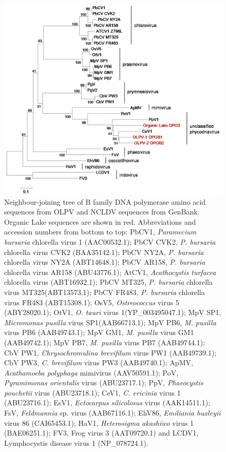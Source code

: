 \begin{figure}
\includegraphics[width=\textwidth]{olv_figures/OLPV_full_dpo.jpg}
\caption[Phylogeny of \acs{OLPV} B family DNA polymerase sequences]{Neighbour-joining tree of B family DNA polymerase amino acid sequences from \acs{OLPV} and \acs{NCLDV} sequences from GenBank. 
Organic Lake sequences are shown in red.
Abbreviations and accession numbers from bottom to top: PbCV1, \emph{Paramecium bursaria} chlorella virus 1 (AAC00532.1); PbCV CVK2, \emph{P. bursaria} chlorella virus CVK2 (BAA35142.1); PbCV NY2A,  \emph{P. bursaria} chlorella virus NY2A (ABT14648.1); PbCV AR158, \emph{P. bursaria} chlorella virus AR158 (ABU43776.1); AtCV1, \emph{Acathocystis turfacea} chlorella virus (ABT16932.1); PbCV MT325,  \emph{P. bursaria} chlorella virus MT325(ABT13573.1); PbCV FR483, \emph{P. bursaria} chlorella virus FR483 (ABT15308.1); OsV5, \emph{Ostreococcus} virus 5 (ABY28020.1); OtV1, \emph{O. tauri} virus 1(YP\_003495047.1);  MpV SP1, \emph{Micromonas pusilla} virus SP1(AAB66713.1); MpV PB6, \emph{M. pusilla} virus PB6 (AAB49743.1); MpV GM1, \emph{M. pusilla} virus GM1 (AAB49742.1); MpV PB7, \emph{M. pusilla} virus PB7 (AAB49744.1); CbV PW1, \emph{Chrysochromulina brevifilum} virus PW1 (AAB49739.1); CbV PW3, \emph{C. brevifilum} virus PW3 (AAB49740.1); ApMV, \emph{Acathamoeba polyphaga} mimivirus (AAV50591.1); PoV,  \emph{Pyramimonas orientalis} virus (ABU23717.1); PpV, \emph{Phaeocystis pouchetii} virus (ABU23718.1); CeV1, \emph{C. ericinia} virus 1 (ABU23716.1); EsV1, \emph{Ectocarpus silicolosus} virus (AAK14511.1); FsV, \emph{Feldmannia} sp. virus (AAB67116.1); EhV86, \emph{Emiliania huxleyii} virus 86 (CAI65453.1); HaV1, \emph{Heterosigma akashiwo} virus 1 (BAE06251.1); FV3, Frog virus 3 (AAT09720.1) and LCDV1, Lymphocystis disease virus 1 (NP\_078724.1). 
}
\label{fig:OLPV_full_dpo}

\end{figure}
